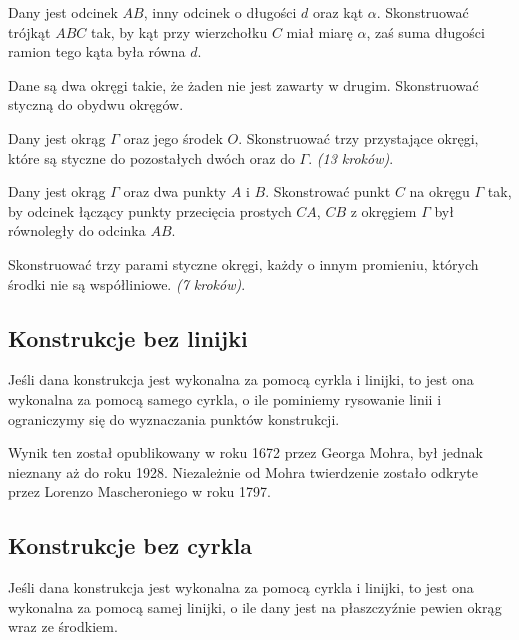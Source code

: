 \begin{problem}
    Dany jest odcinek $AB$, inny odcinek o długości $d$ oraz kąt $\alpha$.
    Skonstruować trójkąt $ABC$ tak, by kąt przy wierzchołku $C$ miał miarę $\alpha$, zaś suma długości ramion tego kąta była równa $d$.
\end{problem}

\begin{problem}
    Dane są dwa okręgi takie, że żaden nie jest zawarty w drugim.
    Skonstruować styczną do obydwu okręgów.
\end{problem}

\begin{problem}
    Dany jest okrąg $\Gamma$ oraz jego środek $O$.
    Skonstruować trzy przystające okręgi, które są styczne do pozostałych dwóch oraz do $\Gamma$. \hfill \emph{(13 kroków)}. %
\end{problem}

\begin{problem}
    Dany jest okrąg $\Gamma$ oraz dwa punkty $A$ i $B$.
    Skonstrować punkt $C$ na okręgu $\Gamma$ tak, by odcinek łączący punkty przecięcia prostych $CA$, $CB$ z okręgiem $\Gamma$ był równoległy do odcinka $AB$.
\end{problem}

\begin{problem}
    Skonstruować trzy parami styczne okręgi, każdy o innym promieniu, których środki nie są współliniowe. \hfill \emph{(7 kroków)}. %
\end{problem}

\subsection{Konstrukcje bez linijki}
\begin{theorem}
    Jeśli dana konstrukcja jest wykonalna za pomocą cyrkla i linijki, to jest ona wykonalna za pomocą samego cyrkla, o ile pominiemy rysowanie linii i ograniczymy się do wyznaczania punktów konstrukcji.
\end{theorem}

Wynik ten został opublikowany w roku 1672 przez Georga Mohra, był jednak nieznany aż do roku 1928. Niezależnie od Mohra twierdzenie zostało odkryte przez Lorenzo Mascheroniego w roku 1797.


\subsection{Konstrukcje bez cyrkla}
\begin{theorem}
    Jeśli dana konstrukcja jest wykonalna za pomocą cyrkla i linijki, to jest ona wykonalna za pomocą samej linijki, o ile dany jest na płaszczyźnie pewien okrąg wraz ze środkiem.
\end{theorem}

